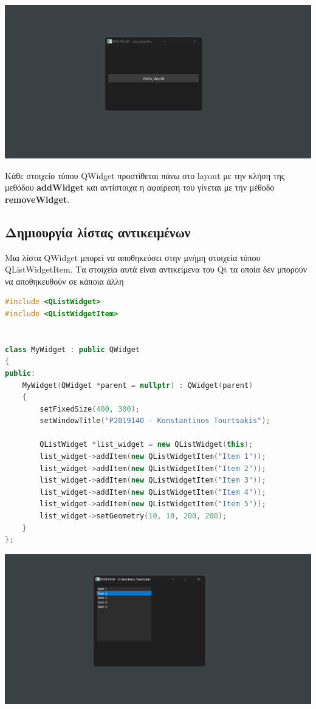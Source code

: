 \includegraphics[width=1.0\textwidth]{./images/QVBoxLayout.png}

Κάθε στοιχείο τύπου QWidget προστίθεται πάνω στο layout με την κλήση της μεθόδου
\textbf{addWidget} και αντίστοιχα η αφαίρεση του γίνεται με την μέθοδο \textbf{removeWidget}.

\subsection{Δημιουργία λίστας αντικειμένων}
Μια λίστα QWidget μπορεί να αποθηκεύσει στην μνήμη στοιχεία τύπου QListWidgetItem.
Τα στοιχεία αυτά είναι αντικείμενα του Qt τα οποία δεν μπορούν να αποθηκευθούν σε
κάποια άλλη 


\begin{lstlisting}[language=C++, style=cppstyle]
#include <QListWidget>
#include <QListWidgetItem>


class MyWidget : public QWidget 
{
public:
    MyWidget(QWidget *parent = nullptr) : QWidget(parent) 
    {
        setFixedSize(400, 300);
        setWindowTitle("P2019140 - Konstantinos Tourtsakis");

        QListWidget *list_widget = new QListWidget(this);
        list_widget->addItem(new QListWidgetItem("Item 1"));
        list_widget->addItem(new QListWidgetItem("Item 2"));
        list_widget->addItem(new QListWidgetItem("Item 3"));
        list_widget->addItem(new QListWidgetItem("Item 4"));
        list_widget->addItem(new QListWidgetItem("Item 5"));
        list_widget->setGeometry(10, 10, 200, 200);
    }
};
\end{lstlisting}

\includegraphics[width=1.0\textwidth]{./images/QListWidget.png}

